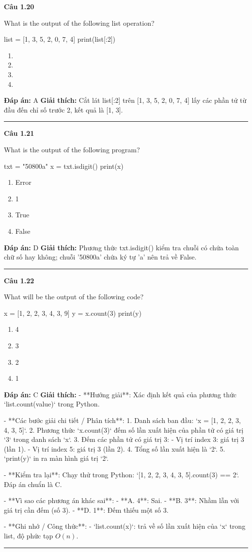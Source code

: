 \documentclass[11pt,a4paper]{article}
\newenvironment{question}[1]{%
  \par\vspace{1em}\noindent\textbf{\large Câu #1}\par\vspace{0.4em}
}{%
  \par\vspace{1em}\hrule\vspace{0.6em}
}
\newenvironment{choices}{%
  \begin{enumerate}[label=\textbf{\Alph*.},leftmargin=2.2em,itemsep=2pt,topsep=3pt]
}{%
  \end{enumerate}
}
\newcommand{\choice}{\item}
\newenvironment{codebox}{%
  \begin{tcolorbox}[colback=gray!8!white,colframe=gray!50!black,arc=1.5mm,boxrule=0.6pt,left=3mm,right=3mm,top=2.5mm,bottom=2.5mm]
  \ttfamily\small
}{%
  \end{tcolorbox}
}
\begin{document}
\begin{question}{1.20}
What is the output of the following list operation?
\begin{codebox}
list = [1, 3, 5, 2, 0, 7, 4]
print(list[:2])
\end{codebox}
\begin{choices}
\choice [1, 3]
\choice [1, 3, 5]
\choice [1]
\choice [5, 2, 0, 7, 4]
\end{choices}
\textbf{Đáp án:} A
\textbf{Giải thích:} Cắt lát list[:2] trên [1, 3, 5, 2, 0, 7, 4] lấy các phần tử từ đầu đến chỉ số trước 2, kết quả là [1, 3].
\end{question}

\begin{question}{1.21}
What is the output of the following program?
\begin{codebox}
txt = "50800a"
x = txt.isdigit()
print(x)
\end{codebox}
\begin{choices}
\choice Error
\choice 1
\choice True
\choice False
\end{choices}
\textbf{Đáp án:} D
\textbf{Giải thích:} Phương thức txt.isdigit() kiểm tra chuỗi có chứa toàn chữ số hay không; chuỗi '50800a' chứa ký tự 'a' nên trả về False.
\end{question}

\begin{question}{1.22}
What will be the output of the following code?
\begin{codebox}
x = [1, 2, 2, 3, 4, 3, 9]
y = x.count(3)
print(y)
\end{codebox}
\begin{choices}
\choice 4
\choice 3
\choice 2
\choice 1
\end{choices}
\textbf{Đáp án:} C
\textbf{Giải thích:} - **Hướng giải**:
  Xác định kết quả của phương thức `list.count(value)` trong Python.

- **Các bước giải chi tiết / Phân tích**:
  1. Danh sách ban đầu: `x = [1, 2, 2, 3, 4, 3, 5]`.
  2. Phương thức `x.count(3)` đếm số lần xuất hiện của phần tử có giá trị `3` trong danh sách `x`.
  3. Đếm các phần tử có giá trị 3:
     - Vị trí index 3: giá trị 3 (lần 1).
     - Vị trí index 5: giá trị 3 (lần 2).
  4. Tổng số lần xuất hiện là `2`.
  5. `print(y)` in ra màn hình giá trị `2`.

- **Kiểm tra lại**:
  Chạy thử trong Python: `[1, 2, 2, 3, 4, 3, 5].count(3) == 2`.
  Đáp án chuẩn là C.

- **Vì sao các phương án khác sai**:
  - **A. 4**: Sai.
  - **B. 3**: Nhầm lẫn với giá trị cần đếm (số 3).
  - **D. 1**: Đếm thiếu một số 3.

- **Ghi nhớ / Công thức**:
  - `list.count(x)`: trả về số lần xuất hiện của `x` trong list, độ phức tạp \(O(n)\).
\end{question}
\end{document}
